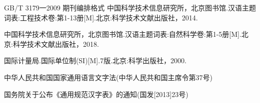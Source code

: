 \documentclass{GB-template}
\begin{document}

\mainmatter

%
\appendix\autoclearpage



\newpage
\begin{thebibliography}{9}

 GB/T 3179一2009 期刊编排格式
 中国科学技术信息研究所，北京图书馆.汉语主题词表:工程技术卷:第1-13册[M].北京:科学技术文献出版社，2014.

 中国科学技术信息研究所，北京图书馆.汉语主题词表:自然科学卷:第1-5册[M].北京:科学技术文献出版社，2018.

 国际计量局.国际单位制(SI)[M].7版.北京:科学出版社，2000.

 中华人民共和国国家通用语言文字法(中华人民共和国主席令第37号)

 国务院关于公布《通用规范汉字表》的通知(国发[2013]23号)

\end{thebibliography}
\end{document}
